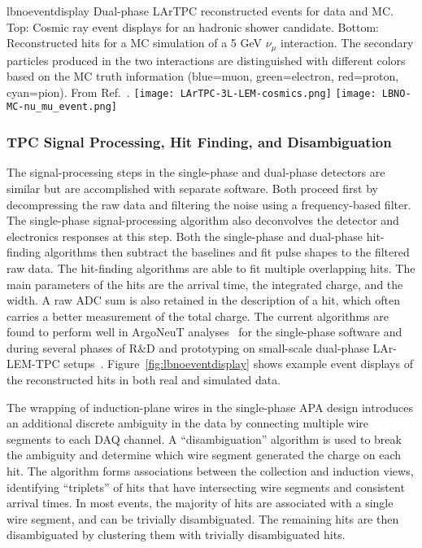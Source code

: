 \begin{cdrfigure}{lbnoeventdisplay}
{
Dual-phase LArTPC reconstructed events for data and MC.
Top: Cosmic ray event displays for an hadronic shower candidate.
Bottom: Reconstructed hits for a MC simulation of a 5 GeV $\nu_{\mu}$ interaction.
The secondary particles produced in the two interactions are 
distinguished with different colors based on the MC truth information (blue=muon, green=electron, red=proton, cyan=pion).
From Ref.~\cite{Badertscher:2012dq}.
}
\texttt{[image: LArTPC-3L-LEM-cosmics.png]}
\texttt{[image: LBNO-MC-nu\_mu\_event.png]}
\end{cdrfigure}

\subsubsection{TPC Signal Processing, Hit Finding, and Disambiguation}

The signal-processing steps in the single-phase and dual-phase detectors are similar but
are accomplished with separate software.  Both proceed first by decompressing the raw data
and filtering the noise using a frequency-based filter.  The single-phase signal-processing
algorithm also deconvolves the detector and electronics responses at this step.
Both the single-phase and dual-phase hit-finding algorithms then subtract the baselines
and fit pulse shapes to the filtered raw data.  The hit-finding algorithms are able to
fit multiple overlapping hits.  The main parameters of the hits are the arrival time, the
integrated charge, and the width.  A raw ADC sum is also retained in the description of a hit, which
often carries a better measurement of the total charge.
The current algorithms are found to perform well in 
ArgoNeuT analyses~\cite{Anderson:2012vc} for the single-phase software and during several phases 
of R$\&$D and prototyping on small-scale dual-phase LAr-LEM-TPC 
setups~\cite{Badertscher:2008rf,Badertscher:2012dq}.
Figure~\ref{fig:lbnoeventdisplay} shows example event displays of the reconstructed hits 
in both real and simulated data. 

The wrapping of induction-plane wires in the single-phase APA design
introduces an additional discrete ambiguity in the data by connecting multiple wire
segments to each DAQ channel. A ``disambiguation'' algorithm is used to break the
ambiguity and determine which wire segment generated the charge on each hit.
The algorithm forms associations between the collection and induction views,
identifying ``triplets'' of hits that have intersecting wire segments
and consistent arrival times. In most events, the majority of hits are
associated with a single wire segment, and can be trivially disambiguated.
The remaining hits are then disambiguated by clustering them with trivially disambiguated hits.

